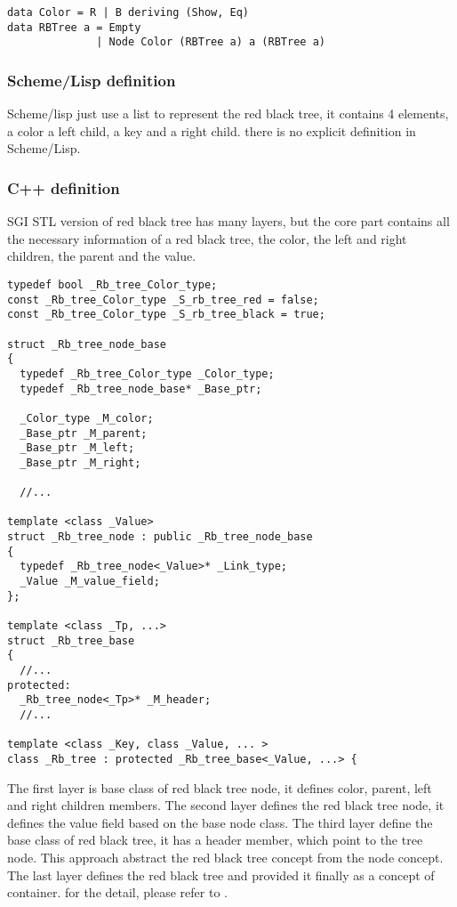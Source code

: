 \documentclass{article}
\begin{document}
\lstset{language=Haskell}
\begin{lstlisting}
data Color = R | B deriving (Show, Eq) 
data RBTree a = Empty
              | Node Color (RBTree a) a (RBTree a)
\end{lstlisting}

\subsubsection*{Scheme/Lisp definition}
Scheme/lisp just use a list to represent the red black tree, it
contains 4 elements, a color a left child, a key and a right
child. there is no explicit definition in Scheme/Lisp. 

\subsubsection*{C++ definition}
SGI STL version of red black tree has many layers, but the core part
contains all the necessary information of a red black tree, the
color, the left and right children, the parent and the value.

\lstset{language=c++}
\begin{lstlisting}
typedef bool _Rb_tree_Color_type;
const _Rb_tree_Color_type _S_rb_tree_red = false;
const _Rb_tree_Color_type _S_rb_tree_black = true;

struct _Rb_tree_node_base
{
  typedef _Rb_tree_Color_type _Color_type;
  typedef _Rb_tree_node_base* _Base_ptr;

  _Color_type _M_color; 
  _Base_ptr _M_parent;
  _Base_ptr _M_left;
  _Base_ptr _M_right;

  //...

template <class _Value>
struct _Rb_tree_node : public _Rb_tree_node_base
{
  typedef _Rb_tree_node<_Value>* _Link_type;
  _Value _M_value_field;
};

template <class _Tp, ...>
struct _Rb_tree_base
{
  //...
protected:
  _Rb_tree_node<_Tp>* _M_header;
  //...

template <class _Key, class _Value, ... >
class _Rb_tree : protected _Rb_tree_base<_Value, ...> {
\end{lstlisting}

The first layer is base class of red black tree node, it defines
color, parent, left and right children members. The second layer
defines the red black tree node, it defines the value field based on
the base node class. The third layer define the base class of red
black tree, it has a header member, which point to the tree node.
This approach abstract the red black tree concept from the node
concept. The last layer defines the red black tree and provided it
finally as a concept of container. for the detail, please refer to \cite{sgi-stl}.
\end{document}
